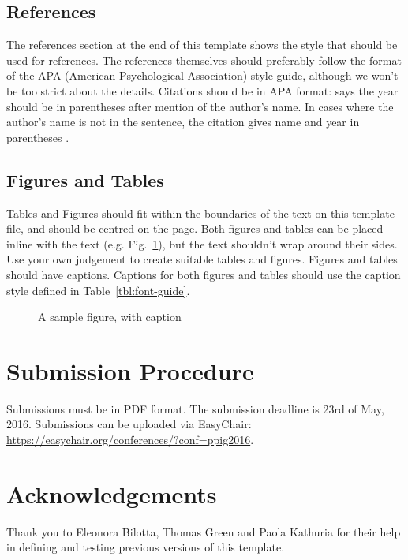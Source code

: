 \documentclass{ppig}
\begin{document}
\subsection{References}

The references section at the end of this template shows the style that should be used for references. The references themselves should preferably follow the format of the APA (American Psychological Association) style guide, although we won't be too strict about the details. Citations should be in APA format:  says the year should be in parentheses after mention of the author's name. In cases where the author's name is not in the sentence, the citation gives name and year in parentheses \cite{blackwell1999how}.

\subsection{Figures and Tables}

Tables and Figures should fit within the boundaries of the text on this template file, and should be centred on the page. Both figures and tables can be placed inline with the text (e.g. Fig.~\ref{fig:sample-figure}), but the text shouldn't wrap around their sides. Use your own judgement to create suitable tables and figures. Figures and tables should have captions. Captions for both figures and tables should use the caption style defined in Table~\ref{tbl:font-guide}.

\begin{figure}[h]
	\centering
	\caption{A sample figure, with caption}
	\label{fig:sample-figure}
\end{figure}

\section{Submission Procedure}

Submissions must be in PDF format. The submission deadline is 23rd of May, 2016. Submissions can be uploaded via EasyChair: \url{https://easychair.org/conferences/?conf=ppig2016}.

\section{Acknowledgements}
Thank you to Eleonora Bilotta, Thomas Green and Paola Kathuria for their help in defining and testing previous versions of this template.


 
\end{document}
